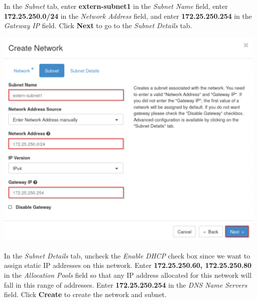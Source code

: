 \documentclass[letterpaper, 12pt]{article}
\begin{document}
\begin{enumerate}
    \begin{labstep}
        In the \textit{Subnet} tab, enter \textbf{extern-subnet1} in the \textit{Subnet Name} field, enter \textbf{172.25.250.0/24} in the \textit{Network Address} field, and enter \textbf{172.25.250.254} in the \textit{Gateway IP} field.
        Click \textbf{Next} to go to the \textit{Subnet Details} tab.

        \begin{center}
            \includegraphics[width=\linewidth]{images/part1/step8.png}
        \end{center}
    \end{labstep}

    \begin{labstep}
        In the \textit{Subnet Details} tab, uncheck the \textit{Enable DHCP} check box since we want to assign static IP addresses on this network.
        Enter \textbf{172.25.250.60, 172.25.250.80} in the \textit{Allocation Pools} field so that any IP address allocated for this network will fall in this range of addresses.
        Enter \textbf{172.25.250.254} in the \textit{DNS Name Servers} field.
        Click \textbf{Create} to create the network and subnet.


\end{labstep}
\end{enumerate}
\end{document}
